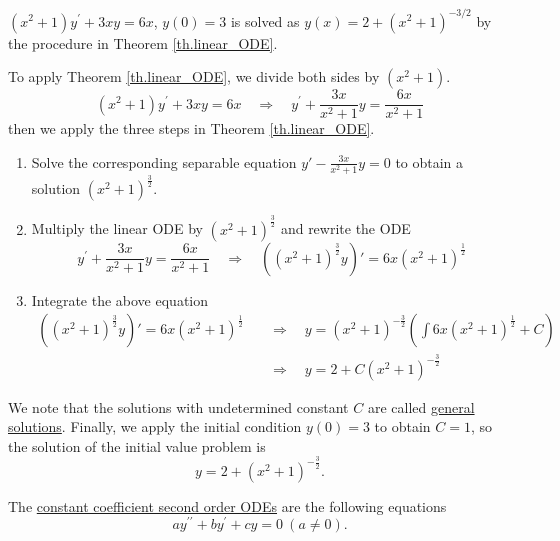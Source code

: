 \begin{example}[]
    $(x^2+1) y^{\prime}+3 x y=6 x$, $y(0)=3$ is solved as $y(x)=2+(x^2+1)^{-3 / 2}$ by the procedure in Theorem \ref{th.linear_ODE}.

    To apply Theorem \ref{th.linear_ODE}, we divide both sides by $(x^2+1)$.
    \begin{equation*}
        (x^2+1) y^{\prime}+3 x y=6x 
        \quad\Rightarrow\quad
        y^{\prime} + \frac{3 x}{x^2+1} y = \frac{6x}{x^2+1}
    \end{equation*}
    then we apply the three steps in  Theorem \ref{th.linear_ODE}.
    \begin{enumerate}
        \item Solve the corresponding separable equation $y' - \frac{3 x}{x^2+1}y = 0$ to obtain a solution $(x^2+1)^{\frac{3}{2}}$.
        \item Multiply the linear ODE by $(x^2+1)^{\frac{3}{2}}$ and rewrite the ODE
        \begin{equation*}
            y^{\prime} + \frac{3 x}{x^2+1} y = \frac{6x}{x^2+1} 
            \quad\Rightarrow\quad
            ((x^2+1)^{\frac{3}{2}}y)' = 6x(x^2+1)^{\frac{1}{2}}
        \end{equation*}
        \item Integrate the above equation
        \begin{equation*}
            \begin{split}
                ((x^2+1)^{\frac{3}{2}}y)' = 6x(x^2+1)^{\frac{1}{2}}
                \quad&\Rightarrow\quad
                y = (x^2+1)^{-\frac{3}{2}} \left(\int 6x(x^2+1)^{\frac{1}{2}}+ C\right)
                \\
                &\Rightarrow\quad
                y = 2 + C(x^2+1)^{-\frac{3}{2}}
            \end{split} 
        \end{equation*}
    \end{enumerate}

We note that the solutions with undetermined constant $C$ are called \underline{general solutions}. Finally, we apply the initial condition $y(0)=3$ to obtain $C = 1$, so the solution of the initial value problem is 
\begin{equation*}
    y = 2 + (x^2+1)^{-\frac{3}{2}}.
\end{equation*}
\end{example}

\begin{definition}
    The \underline{constant coefficient second order ODEs} are the following equations
    \begin{equation}\label{eq.2nd_ODE}
        a y^{\prime \prime}+b y^{\prime}+c y=0\ (a \neq 0) .
    \end{equation}
\end{definition}

